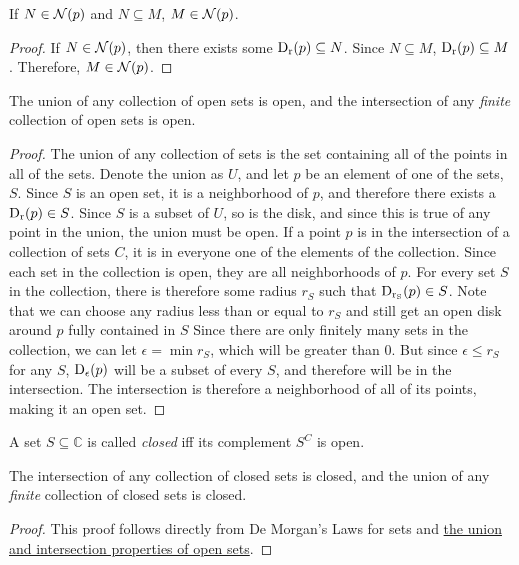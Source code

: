 \documentclass{refbook}
\begin{document}
\begin{lemma}
If $N \in \nbhd{p}$ and $N \subseteq M$, $M \in \nbhd{p}$.
\end{lemma}
\begin{proof}
If $N \in \nbhd{p}$, then there exists some $\disk{p}{r} \subseteq N$. Since $N \subseteq M$, $\disk{p}{r} \subseteq M$. Therefore, $M \in \nbhd{p}$.
\end{proof}
\begin{lemma}
The union of any collection of open sets is open, and the intersection of any \emph{finite} collection of open sets is open.
\end{lemma}
\begin{proof}
The union of any collection of sets is the set containing all of the points in all of the sets. Denote the union as $U$, and let $p$ be an element of one of the sets, $S$. Since $S$ is an open set, it is a neighborhood of $p$, and therefore there exists a $\disk{p}{r} \in S$.
Since $S$ is a subset of $U$, so is the disk, and since this is true of any point in the union, the union must be open.
If a point $p$ is in the intersection of a collection of sets $C$, it is in everyone one of the elements of the collection. Since each set in the collection is open, they are all neighborhoods of $p$. For every set $S$ in the collection, there is therefore some radius $r_S$ such that $\disk{p}{r_S} \in S$. Note that we can choose any radius less than or equal to $r_S$ and still get an open disk around $p$ fully contained in $S$
Since there are only finitely many sets in the collection, we can let $\epsilon = \min r_S$, which will be greater than $0$. But since $\epsilon \leq r_S$ for any $S$, $\disk{p}{\epsilon}$ will be a subset of every $S$, and therefore will be in the intersection. The intersection is therefore a neighborhood of all of its points, making it an open set. 
\end{proof}
\begin{definition}
A set $S \subseteq \mathbb{C}$ is called \emph{closed} iff its complement $S^C$ is open.
\end{definition}
\begin{lemma}
The intersection of any collection of closed sets is closed, and the union of any \emph{finite} collection of closed sets is closed.
\end{lemma}
\begin{proof}
This proof follows directly from De Morgan's Laws for sets and \hyperlink{Properties of Open Sets}{the union and intersection properties of open sets}.
\end{proof}
\end{document}

